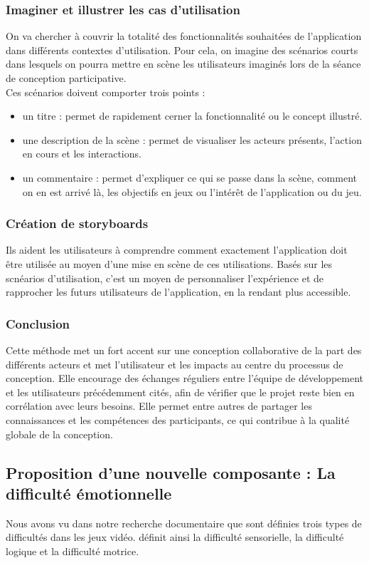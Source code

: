 \documentclass[french, 12pt]{article} %
\begin{document}
\subsubsection*{Imaginer et illustrer les cas d'utilisation}
On va chercher à couvrir la totalité des fonctionnalités souhaitées de l'application dans différents contextes d'utilisation. Pour cela, on imagine des scénarios courts dans lesquels on pourra mettre en scène les utilisateurs imaginés lors de la séance de conception participative. \\
Ces scénarios doivent comporter trois points :
\begin{itemize}
	\item un titre : permet de rapidement cerner la fonctionnalité ou le concept illustré.
	\item une description de la scène : permet de visualiser les acteurs présents, l'action en cours et les interactions.
	\item un commentaire : permet d'expliquer ce qui se passe dans la scène, comment on en est arrivé là, les objectifs en jeux ou l'intérêt de l'application ou du jeu.
\end{itemize}

\subsubsection*{Création de storyboards}
Ils aident les utilisateurs à comprendre comment exactement l'application doit être utilisée au moyen d'une mise en scène de ces utilisations. Basés sur les scnéarios d'utilisation, c'est un moyen de personnaliser l'expérience et de rapprocher les futurs utilisateurs de l'application, en la rendant plus accessible.

\subsubsection*{Conclusion}
Cette méthode met un fort accent sur une conception collaborative de la part des différents acteurs et met l'utilisateur et les impacts au centre du processus de conception. Elle encourage des échanges réguliers entre l'équipe de développement et les utilisateurs précédemment cités, afin de vérifier que le projet reste bien en corrélation avec leurs besoins. Elle permet entre autres de partager les connaissances et les compétences des participants, ce qui contribue à la qualité globale de la conception.

\subsection{Proposition d'une nouvelle composante : La difficulté émotionnelle}
Nous avons vu dans notre recherche documentaire que sont définies trois types de difficultés dans les jeux vidéo. \cite{Levi11} définit ainsi la difficulté sensorielle, la difficulté logique et la difficulté motrice.
\end{document}
